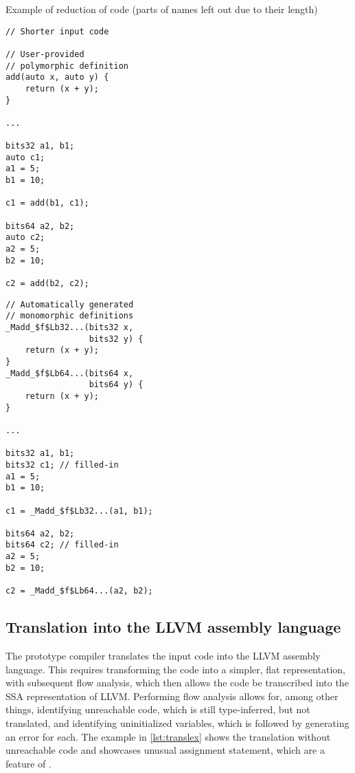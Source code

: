 \begin{listing}
    \caption{Example of reduction of code (parts of names left out due to their length)}
    \label{lst:reduction}
    \begin{center}
    \begin{minipage}{0.5\linewidth}
    \begin{lstlisting}
// Shorter input code

// User-provided
// polymorphic definition
add(auto x, auto y) {
    return (x + y);
}

...

bits32 a1, b1;
auto c1;
a1 = 5;
b1 = 10;

c1 = add(b1, c1);

bits64 a2, b2;
auto c2;
a2 = 5;
b2 = 10;

c2 = add(b2, c2);
    \end{lstlisting}
    \end{minipage}%
    \begin{minipage}{0.5\linewidth}
    \begin{lstlisting}
// Automatically generated
// monomorphic definitions
_Madd_$f$Lb32...(bits32 x,
                 bits32 y) {
    return (x + y);
}
_Madd_$f$Lb64...(bits64 x,
                 bits64 y) {
    return (x + y);
}

...

bits32 a1, b1;
bits32 c1; // filled-in
a1 = 5;
b1 = 10;

c1 = _Madd_$f$Lb32...(a1, b1);

bits64 a2, b2;
bits64 c2; // filled-in
a2 = 5;
b2 = 10;

c2 = _Madd_$f$Lb64...(a2, b2);
    \end{lstlisting}
    \end{minipage}
    \end{center}
\end{listing}

\subsection{Translation into the LLVM assembly language}

The prototype compiler translates the input code into the LLVM assembly language. This requires transforming the code into a simpler, flat representation, with subsequent flow analysis, which then allows the code be transcribed into the SSA representation of LLVM. Performing flow analysis allows for, among other things, identifying unreachable code, which is still type-inferred, but not translated, and identifying uninitialized variables, which is followed by generating an error for each. The example in \cref{lst:translex} shows the translation without unreachable code and showcases unusual assignment statement, which are a feature of \cmm{}.

